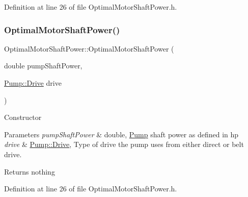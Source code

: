 Definition at line 26 of file Optimal\+Motor\+Shaft\+Power.\+h.

\mbox{\label{class_optimal_motor_shaft_power_a5b793114a451ef9fe7a29f9db9f44bb6}} 
\subsubsection{\texorpdfstring{Optimal\+Motor\+Shaft\+Power()}{OptimalMotorShaftPower()}\hspace{0.1cm}{\footnotesize\ttfamily [2/3]}}
{\footnotesize\ttfamily Optimal\+Motor\+Shaft\+Power\+::\+Optimal\+Motor\+Shaft\+Power (\begin{DoxyParamCaption}\item[{double}]{pump\+Shaft\+Power,  }\item[{\hyperlink{class_pump_a32bf0ade131a11bb3b3fb374f638e983}{Pump\+::\+Drive}}]{drive }\end{DoxyParamCaption})\hspace{0.3cm}{\ttfamily [inline]}}

Constructor 
\begin{DoxyParams}{Parameters}
{\em pump\+Shaft\+Power} & double, \hyperlink{class_pump}{Pump} shaft power as defined in hp \\
\hline
{\em drive} & \hyperlink{class_pump_a32bf0ade131a11bb3b3fb374f638e983}{Pump\+::\+Drive}, Type of drive the pump uses from either direct or belt drive. \\
\hline
\end{DoxyParams}
\begin{DoxyReturn}{Returns}
nothing 
\end{DoxyReturn}


Definition at line 26 of file Optimal\+Motor\+Shaft\+Power.\+h.

\mbox{\label{class_optimal_motor_shaft_power_a5b793114a451ef9fe7a29f9db9f44bb6}} 
